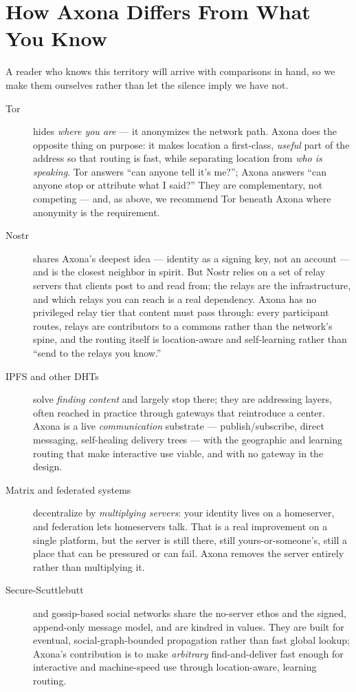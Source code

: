 \documentclass[nobib,justified]{tufte-handout}
\begin{document}
\section{How Axona Differs From What You Know}

A reader who knows this territory will arrive with comparisons in hand, so we make them ourselves rather than let the silence imply we have not.

\begin{description}
\item[Tor] hides \emph{where you are} --- it anonymizes the network path. Axona
does the opposite thing on purpose: it makes location a first-class,
\emph{useful} part of the address so that routing is fast, while separating
location from \emph{who is speaking}. Tor answers ``can anyone tell it's me?'';
Axona answers ``can anyone stop or attribute what I said?'' They are
complementary, not competing --- and, as above, we recommend Tor beneath Axona
where anonymity is the requirement.

\item[Nostr] shares Axona's deepest idea --- identity as a signing key, not an
account --- and is the closest neighbor in spirit. But Nostr relies on a set of
relay servers that clients post to and read from; the relays are the
infrastructure, and which relays you can reach is a real dependency. Axona has no
privileged relay tier that content must pass through: every participant routes,
relays are contributors to a commons rather than the network's spine, and the
routing itself is location-aware and self-learning rather than ``send to the
relays you know.''

\item[IPFS and other DHTs] solve \emph{finding content} and largely stop there;
they are addressing layers, often reached in practice through gateways that
reintroduce a center. Axona is a live \emph{communication} substrate ---
publish/subscribe, direct messaging, self-healing delivery trees --- with the
geographic and learning routing that make interactive use viable, and with no
gateway in the design.

\item[Matrix and federated systems] decentralize by \emph{multiplying servers}:
your identity lives on a homeserver, and federation lets homeservers talk. That is
a real improvement on a single platform, but the server is still there, still
yours-or-someone's, still a place that can be pressured or can fail. Axona removes
the server entirely rather than multiplying it.

\item[Secure-Scuttlebutt] and gossip-based social networks share the no-server
ethos and the signed, append-only message model, and are kindred in values. They
are built for eventual, social-graph-bounded propagation rather than fast global
lookup; Axona's contribution is to make \emph{arbitrary} find-and-deliver fast
enough for interactive and machine-speed use through location-aware, learning
routing.
\end{description}
\end{document}
